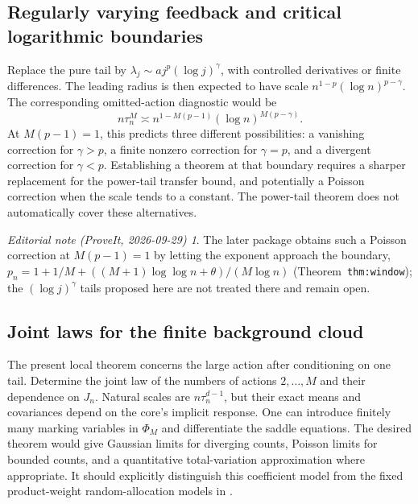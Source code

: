 \documentclass[11pt,a4paper]{article}
\numberwithin{equation}{section}
\theoremstyle{definition}
\theoremstyle{remark}
\newtheorem*{ednote}{Editorial note (ProveIt, 2026-09-29)}
\begin{document}
\subsection{Regularly varying feedback and critical logarithmic boundaries}

Replace the pure tail by
$\lambda_j\sim a j^p(\log j)^\gamma$, with controlled derivatives or
finite differences. The leading radius is then expected to have scale
$n^{1-p}(\log n)^{p-\gamma}$. The corresponding omitted-action diagnostic
would be
\[
 n\tau_n^M\asymp
 n^{1-M(p-1)}(\log n)^{M(p-\gamma)}.
\]
At $M(p-1)=1$, this predicts three different possibilities: a vanishing
correction for $\gamma>p$, a finite nonzero correction for $\gamma=p$,
and a divergent correction for $\gamma<p$. Establishing a theorem at that
boundary requires a sharper replacement for the power-tail transfer bound,
and potentially a Poisson correction when the scale tends to a constant.
The power-tail theorem does not automatically cover these alternatives.

\begin{ednote}
The later package \cite{ed:plb} obtains such a Poisson correction at
$M(p-1)=1$ by letting the exponent approach the boundary,
$p_n=1+1/M+((M+1)\log\log n+\theta)/(M\log n)$
(Theorem~\texttt{thm:window}); the $(\log j)^\gamma$ tails proposed here
are not treated there and remain open.
\end{ednote}

\subsection{Joint laws for the finite background cloud}

The present local theorem concerns the large action after conditioning on
one tail. Determine the joint law of the numbers of actions
$2,\ldots,M$ and their dependence on $J_n$. Natural scales are
$n\tau_n^{d-1}$, but their exact means and covariances depend on the core's
implicit response. One can introduce finitely many marking variables in
$\Phi_M$ and differentiate the saddle equations. The desired theorem
would give Gaussian limits for diverging counts, Poisson limits for bounded
counts, and a quantitative total-variation approximation where appropriate.
It should explicitly distinguish this coefficient model from the fixed
product-weight random-allocation models in \cite{jjs,janson}.
\end{document}
